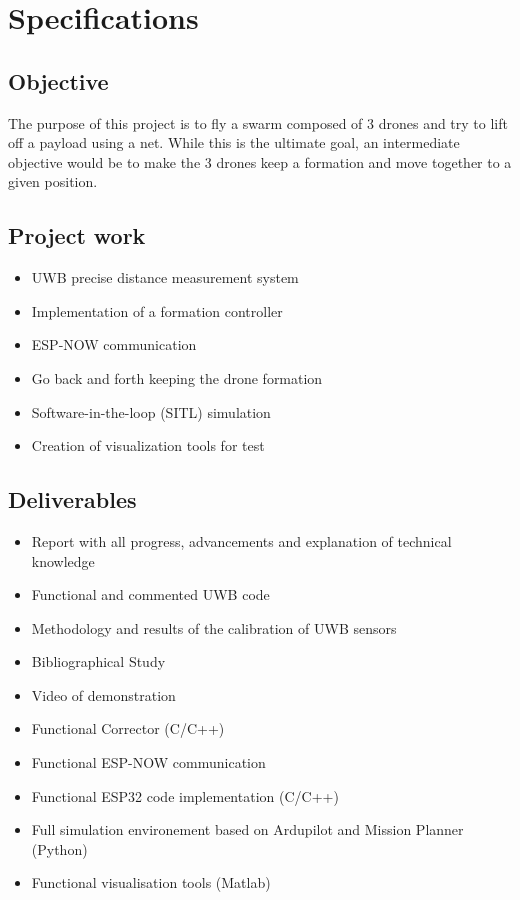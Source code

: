 \chapter{Specifications}

\section{Objective}
The purpose of this project is to fly a swarm composed of 3 drones and try to lift off a payload using a net. While this is the ultimate goal, an intermediate objective
would be to make the 3 drones keep a formation and move together to a given position.
\section{Project work}
\begin{itemize}

    \item UWB precise distance measurement system
    \item Implementation of a formation controller 
    \item ESP-NOW communication
    \item Go back and forth keeping the drone formation 
    \item Software-in-the-loop (SITL) simulation
    \item Creation of visualization tools for test

\end{itemize}

\section{Deliverables}
\begin{itemize}

    \item Report with all progress, advancements and explanation of technical knowledge
    \item Functional and commented UWB code 
    \item Methodology and results of the calibration of UWB sensors
    \item Bibliographical Study
    \item Video of demonstration 
    \item Functional Corrector (C/C++)
    \item Functional ESP-NOW communication
    \item Functional ESP32 code implementation (C/C++)
    \item Full simulation environement based on  Ardupilot and Mission Planner (Python)
    \item Functional visualisation tools (Matlab)

\end{itemize}



\newpage
